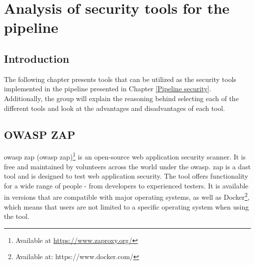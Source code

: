 \chapter{Analysis of security tools for the pipeline}
\label{chap:Tools}
\section{Introduction}
The following chapter presents tools that can be utilized as the security tools implemented in the \gls{pipeline} presented in Chapter \ref{Pipeline security}. Additionally, the group will explain the reasoning behind selecting each of the different tools and look at the advantages and disadvantages of each tool. 

\section{OWASP ZAP}
\acrshort{owasp} \acrlong{zap} (\acrshort{owasp} \acrshort{zap})\footnote{Available at \url{https://www.zaproxy.org/}} is an open-source web application security scanner. It is free and maintained by volunteers across the world under the \acrlong{owasp}. \acrshort{zap} is a \acrshort{dast} tool and is designed to test web application security. The tool offers functionality for a wide range of people - from developers to experienced testers. It is available in versions that are compatible with major operating systems, as well as Docker\footnote{Available at: https://www.docker.com/}, which means that users are not limited to a specific operating system when using the tool.\cite{owaspZAP}

